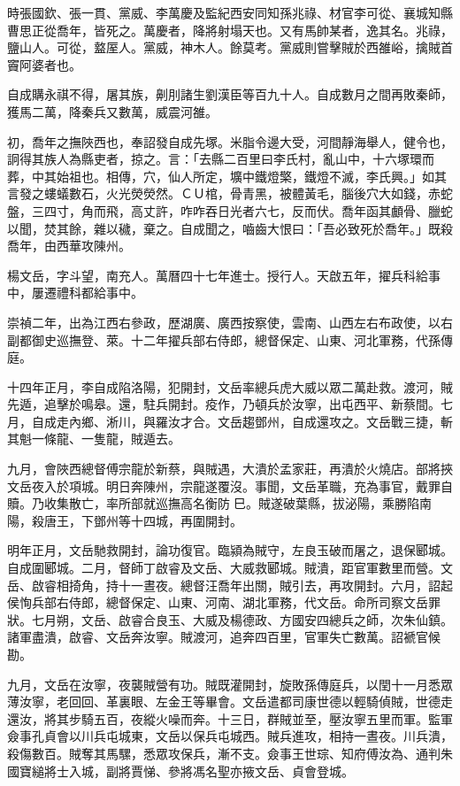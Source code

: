 \begin{pinyinscope}
時張國欽、張一貫、黨威、李萬慶及監紀西安同知孫兆祿、材官李可從、襄城知縣曹思正從喬年，皆死之。萬慶者，降將射塌天也。又有馬帥某者，逸其名。兆祿，鹽山人。可從，盩厔人。黨威，神木人。餘莫考。黨威則嘗擊賊於西雒峪，擒賊首竇阿婆者也。

自成購永祺不得，屠其族，劓刖諸生劉漢臣等百九十人。自成數月之間再敗秦師，獲馬二萬，降秦兵又數萬，威震河雒。

初，喬年之撫陜西也，奉詔發自成先塚。米脂令邊大受，河間靜海舉人，健令也，詗得其族人為縣吏者，掠之。言：「去縣二百里曰李氏村，亂山中，十六塚環而葬，中其始祖也。相傳，穴，仙人所定，壙中鐵燈檠，鐵燈不滅，李氏興。」如其言發之螻蟻數石，火光熒熒然。ＣＵ棺，骨青黑，被體黃毛，腦後穴大如錢，赤蛇盤，三四寸，角而飛，高丈許，咋咋吞日光者六七，反而伏。喬年函其顱骨、臘蛇以聞，焚其餘，雜以穢，棄之。自成聞之，嚙齒大恨曰：「吾必致死於喬年。」既殺喬年，由西華攻陳州。

楊文岳，字斗望，南充人。萬曆四十七年進士。授行人。天啟五年，擢兵科給事中，屢遷禮科都給事中。

崇禎二年，出為江西右參政，歷湖廣、廣西按察使，雲南、山西左右布政使，以右副都御史巡撫登、萊。十二年擢兵部右侍郎，總督保定、山東、河北軍務，代孫傳庭。

十四年正月，李自成陷洛陽，犯開封，文岳率總兵虎大威以眾二萬赴救。渡河，賊先遁，追擊於鳴皋。還，駐兵開封。疫作，乃頓兵於汝寧，出屯西平、新蔡間。七月，自成走內鄉、淅川，與羅汝才合。文岳趨鄧州，自成還攻之。文岳戰三捷，斬其魁一條龍、一隻龍，賊遁去。

九月，會陜西總督傅宗龍於新蔡，與賊遇，大潰於孟家莊，再潰於火燒店。部將挾文岳夜入於項城。明日奔陳州，宗龍遂覆沒。事聞，文岳革職，充為事官，戴罪自贖。乃收集散亡，率所部就巡撫高名衡防巳。賊遂破葉縣，拔泌陽，乘勝陷南陽，殺唐王，下鄧州等十四城，再圍開封。

明年正月，文岳馳救開封，論功復官。臨潁為賊守，左良玉破而屠之，退保郾城。自成圍郾城。二月，督師丁啟睿及文岳、大威救郾城。賊潰，距官軍數里而營。文岳、啟睿相掎角，持十一晝夜。總督汪喬年出關，賊引去，再攻開封。六月，詔起侯恂兵部右侍郎，總督保定、山東、河南、湖北軍務，代文岳。命所司察文岳罪狀。七月朔，文岳、啟睿合良玉、大威及楊德政、方國安四總兵之師，次朱仙鎮。諸軍盡潰，啟睿、文岳奔汝寧。賊渡河，追奔四百里，官軍失亡數萬。詔褫官候勘。

九月，文岳在汝寧，夜襲賊營有功。賊既灌開封，旋敗孫傳庭兵，以閏十一月悉眾薄汝寧，老回回、革裏眼、左金王等畢會。文岳遣都司康世德以輕騎偵賊，世德走還汝，將其步騎五百，夜縱火噪而奔。十三日，群賊並至，壓汝寧五里而軍。監軍僉事孔貞會以川兵屯城東，文岳以保兵屯城西。賊兵進攻，相持一晝夜。川兵潰，殺傷數百。賊奪其馬騾，悉眾攻保兵，漸不支。僉事王世琮、知府傅汝為、通判朱國寶縋將士入城，副將賈悌、參將馮名聖亦掖文岳、貞會登城。


\end{pinyinscope}
